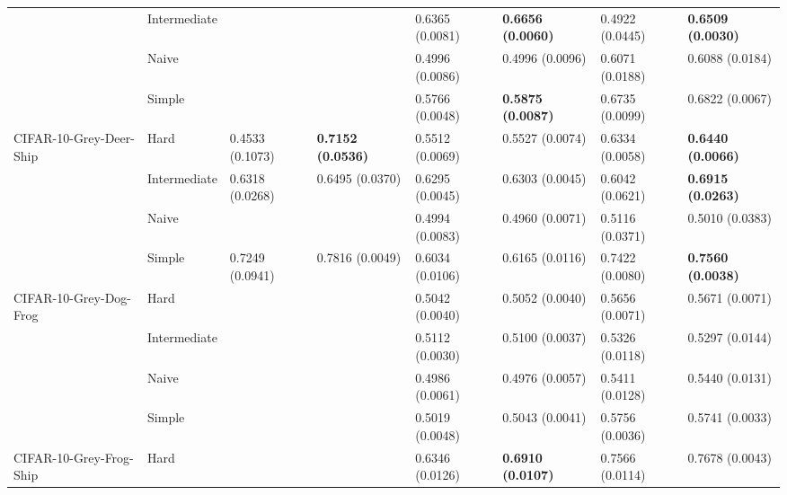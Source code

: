 \begin{tabular}{llllllll}
                 & Intermediate &                  &                           &           0.6365 (0.0081) &  \textbf{0.6656 (0.0060)} &           0.4922 (0.0445) &  \textbf{0.6509 (0.0030)} \\
                 & Naive &                  &                           &           0.4996 (0.0086) &           0.4996 (0.0096) &           0.6071 (0.0188) &           0.6088 (0.0184) \\
                 & Simple &                  &                           &           0.5766 (0.0048) &  \textbf{0.5875 (0.0087)} &           0.6735 (0.0099) &           0.6822 (0.0067) \\
CIFAR-10-Grey-Deer-Ship & Hard &  0.4533 (0.1073) &  \textbf{0.7152 (0.0536)} &           0.5512 (0.0069) &           0.5527 (0.0074) &           0.6334 (0.0058) &  \textbf{0.6440 (0.0066)} \\
                 & Intermediate &  0.6318 (0.0268) &           0.6495 (0.0370) &           0.6295 (0.0045) &           0.6303 (0.0045) &           0.6042 (0.0621) &  \textbf{0.6915 (0.0263)} \\
                 & Naive &                  &                           &           0.4994 (0.0083) &           0.4960 (0.0071) &           0.5116 (0.0371) &           0.5010 (0.0383) \\
                 & Simple &  0.7249 (0.0941) &           0.7816 (0.0049) &           0.6034 (0.0106) &           0.6165 (0.0116) &           0.7422 (0.0080) &  \textbf{0.7560 (0.0038)} \\
CIFAR-10-Grey-Dog-Frog & Hard &                  &                           &           0.5042 (0.0040) &           0.5052 (0.0040) &           0.5656 (0.0071) &           0.5671 (0.0071) \\
                 & Intermediate &                  &                           &           0.5112 (0.0030) &           0.5100 (0.0037) &           0.5326 (0.0118) &           0.5297 (0.0144) \\
                 & Naive &                  &                           &           0.4986 (0.0061) &           0.4976 (0.0057) &           0.5411 (0.0128) &           0.5440 (0.0131) \\
                 & Simple &                  &                           &           0.5019 (0.0048) &           0.5043 (0.0041) &           0.5756 (0.0036) &           0.5741 (0.0033) \\
CIFAR-10-Grey-Frog-Ship & Hard &                  &                           &           0.6346 (0.0126) &  \textbf{0.6910 (0.0107)} &           0.7566 (0.0114) &           0.7678 (0.0043) \\

\end{tabular}
